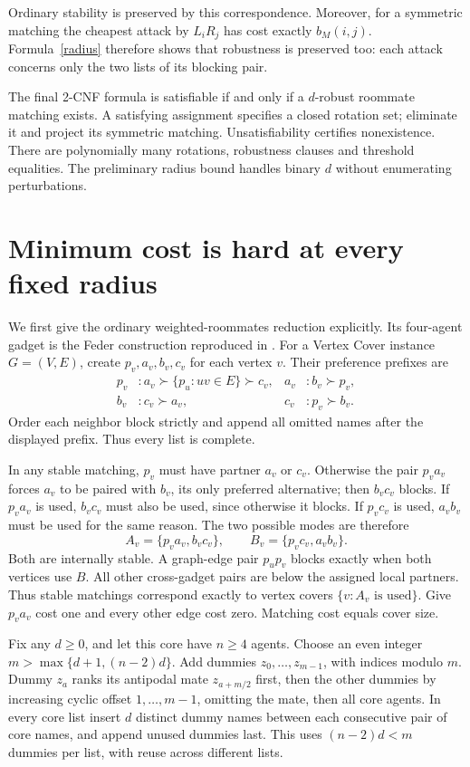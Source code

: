 \documentclass[11pt]{article}
\begin{document}
Ordinary stability is preserved by this correspondence. Moreover, for
a symmetric matching the cheapest attack by $L_iR_j$ has cost exactly
$b_M(i,j)$. Formula~\eqref{radius} therefore shows that robustness is
preserved too: each attack concerns only the two lists of its blocking pair.

The final 2-CNF formula is satisfiable if and only if a $d$-robust
roommate matching exists. A satisfying assignment specifies a closed
rotation set; eliminate it and project its symmetric matching.
Unsatisfiability certifies nonexistence. There are polynomially many
rotations, robustness clauses and threshold equalities. The preliminary
radius bound handles binary $d$ without enumerating perturbations.

\section{Minimum cost is hard at every fixed radius}
We first give the ordinary weighted-roommates reduction explicitly.
Its four-agent gadget is the Feder construction reproduced in
\cite[\S4.1, proof of Proposition 6]{adapting}.
For a Vertex Cover instance $G=(V,E)$, create $p_v,a_v,b_v,c_v$ for
each vertex $v$. Their preference prefixes are
\[
\begin{aligned}
 p_v&:a_v\succ \{p_u:uv\in E\}\succ c_v,&
 a_v&:b_v\succ p_v,\\
 b_v&:c_v\succ a_v,& c_v&:p_v\succ b_v.
\end{aligned}
\]
Order each neighbor block strictly and append all omitted names after
the displayed prefix. Thus every list is complete.

In any stable matching, $p_v$ must have partner $a_v$ or $c_v$.
Otherwise the pair $p_va_v$ forces $a_v$ to be paired with $b_v$, its
only preferred alternative; then $b_vc_v$ blocks. If $p_va_v$ is used,
$b_vc_v$ must also be used, since otherwise it blocks. If $p_vc_v$ is
used, $a_vb_v$ must be used for the same reason. The two possible modes
are therefore
\[
 A_v=\{p_va_v,b_vc_v\},\qquad B_v=\{p_vc_v,a_vb_v\}.
\]
Both are internally stable. A graph-edge pair $p_up_v$ blocks exactly
when both vertices use $B$. All other cross-gadget pairs are below
the assigned local partners. Thus stable matchings correspond exactly
to vertex covers $\{v:A_v\text{ is used}\}$. Give $p_va_v$ cost one
and every other edge cost zero. Matching cost equals cover size.

Fix any $d\geq0$, and let this core have $n\geq4$ agents. Choose an
even integer $m>\max\{d+1,(n-2)d\}$. Add dummies
$z_0,\ldots,z_{m-1}$, with indices modulo $m$. Dummy $z_a$ ranks its
antipodal mate $z_{a+m/2}$ first, then the other dummies by increasing
cyclic offset $1,\ldots,m-1$, omitting the mate, then all core agents.
In every core list insert $d$ distinct dummy names between each
consecutive pair of core names, and append unused dummies last.
This uses $(n-2)d<m$ dummies per list, with reuse across different lists.
\end{document}
